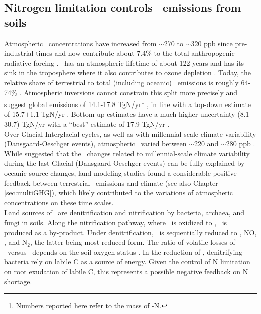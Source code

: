 \subsection{Nitrogen limitation controls \nno\ emissions from soils}
\label{sec:n2o}
Atmospheric \nno\ concentrations have increased from $\sim$270 to $\sim$320 ppb since pre-industrial times \citep{meure06} and now contribute about 7.4\% to the total anthropogenic radiative forcing \citep{ciais13ipcc}. \nno\ has an atmospheric lifetime of about 122 years and has its sink in the troposphere where it also contributes to ozone depletion \citep{hirsch06gbc}. Today, the relative share of terrestrial to total (including oceanic) \nno\ emissions is roughly 64-74\% \citep{hirsch06gbc}. Atmospheric inversions cannot constrain this split more precisely and suggest global emissions of 14.1-17.8 TgN/yr\footnote{Numbers reported here refer to the mass of \nno -N.} \citep{huang08}, in line with a top-down estimate of 15.7$\pm$1.1 TgN/yr \citep{prather12}. Bottom-up estimates have a much higher uncertainty  (8.1-30.7) TgN/yr with a ``best'' estimate of 17.9 TgN/yr \citep{ciais13ipcc}.\\

Over Glacial-Interglacial cycles, as well as with millennial-scale climate variability (Dansgaard-Oeschger events), atmospheric \nno\ varied between $\sim$220 and $\sim$280 ppb \citep{schilt10qsr}. While \citet{schmittnergalbraith08nat} suggested that the \nno\ changes related to millennial-scale climate variability during the last Glacial (Dansgaard-Oeschger events) can be fully explained by oceanic source changes, land modeling studies found a considerable positive feedback between terrestrial \nno\ emissions and climate \citep{xuri12nphyt, stocker13natcc} (see also Chapter \ref{sec:multiGHG}), which likely contributed to the variations of atmospheric concentrations on these time scales.\\

Land sources of \nno\ are denitrification and nitrification by bacteria, archaea, and fungi in soils. Along the nitrification pathway, where \nhhh\ is oxidized to \nooo , \nno\ is produced as a by-product. Under denitrification, \nooo\ is sequentially reduced to \noo , NO, \nno , and N$_2$, the latter being most reduced form. The ratio of volatile losses of \nn\ versus \nno\ depends on the soil oxygen status \citep{simek02}. In the reduction of \nooo , denitrifying bacteria rely on labile C as a source of energy. Given the control of N limitation on root exudation of labile C, this represents a possible negative feedback on N shortage.\\

